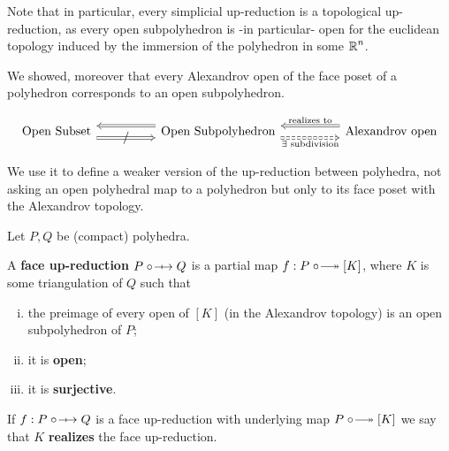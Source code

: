 Note that in particular, every simplicial up-reduction is a topological up-reduction, as every 
open subpolyhedron is -in particular- open for the euclidean topology induced by the immersion 
of the polyhedron in some $\operatorname{\mathbb{R}}^n$.

We showed, moreover that every Alexandrov open of the face poset of a polyhedron corresponds 
to an open subpolyhedron.

\[\begin{tikzcd}[ampersand replacement=\&]
	{\text{Open Subset}} \&\& {\text{Open Subpolyhedron}} \&\& {\text{Alexandrov open}}
	\arrow["{/}"{marking, allow upside down}, shift right=2, Rightarrow, from=1-1, to=1-3]
	\arrow[shift right=2, Rightarrow, from=1-3, to=1-1]
	\arrow["{\exists \text{ subdivision}}"', shift right=2, Rightarrow, dashed, from=1-3, to=1-5]
	\arrow["{\text{realizes to}}"', shift right=2, Rightarrow, from=1-5, to=1-3]
\end{tikzcd}\]

We use it to define a weaker version of the up-reduction between polyhedra, 
not asking an open polyhedral map to a polyhedron but only to its face poset with the Alexandrov topology.

\begin{definition}
    Let $P,Q$ be (compact) polyhedra.

    A \textbf{face up-reduction} $P\fupred Q$ is a partial map $f:P\upred [K]$, where $K$ is 
    some triangulation of $Q$ such that
    \begin{enumerate}[(i)]
        \item the preimage of every open of $[K]$ (in the Alexandrov topology) is an open subpolyhedron of $P$;
        \item it is \textbf{open};
        \item it is \textbf{surjective}.
    \end{enumerate}
    If $f:P\fupred Q$ is a face up-reduction with underlying map $P\upred[K]$ we say that $K$ \textbf{realizes} the face up-reduction.
\end{definition}

